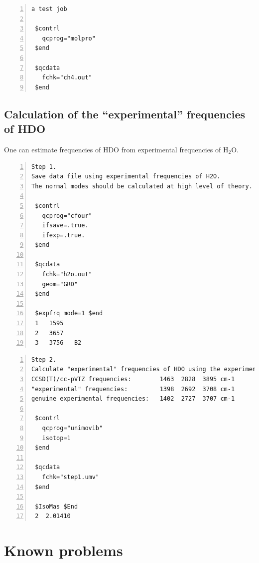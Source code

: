 \documentclass[12pt,english]{extarticle}
\begin{document}
\begin{Verbatim}[frame=single,label=example,labelposition=topline,numbers=left,rulecolor=\color{green},fontsize=\footnotesize,baselinestretch=1.0]
a test job

 $contrl
   qcprog="molpro"
 $end

 $qcdata
   fchk="ch4.out"
 $end
\end{Verbatim}

\subsection{Calculation of the ``experimental'' frequencies of HDO} \label{sec:exp4}

One can estimate frequencies of HDO from experimental frequencies of H$_2$O.

\begin{Verbatim}[frame=single,label=example,labelposition=topline,numbers=left,rulecolor=\color{green},fontsize=\footnotesize,baselinestretch=1.0]
Step 1.
Save data file using experimental frequencies of H2O.
The normal modes should be calculated at high level of theory.

 $contrl
   qcprog="cfour"
   ifsave=.true.
   ifexp=.true.
 $end

 $qcdata
   fchk="h2o.out"
   geom="GRD"
 $end

 $expfrq mode=1 $end
 1   1595
 2   3657
 3   3756   B2
\end{Verbatim}

\begin{Verbatim}[frame=single,label=example,labelposition=topline,numbers=left,rulecolor=\color{green},fontsize=\footnotesize,baselinestretch=1.0]
Step 2.
Calculate "experimental" frequencies of HDO using the experimental frequencies of H2O.
CCSD(T)/cc-pVTZ frequencies:        1463  2828  3895 cm-1
"experimental" frequencies:         1398  2692  3708 cm-1
genuine experimental frequencies:   1402  2727  3707 cm-1

 $contrl
   qcprog="unimovib"
   isotop=1
 $end

 $qcdata
   fchk="step1.umv"
 $end

 $IsoMas $End
 2  2.01410
\end{Verbatim}


\pagebreak{}


\section{Known problems} \label{part:problem}
\end{document}

